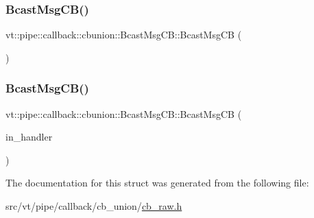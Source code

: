 \subsubsection{\texorpdfstring{Bcast\+Msg\+C\+B()}{BcastMsgCB()}\hspace{0.1cm}{\footnotesize\ttfamily [1/2]}}
{\footnotesize\ttfamily vt\+::pipe\+::callback\+::cbunion\+::\+Bcast\+Msg\+C\+B\+::\+Bcast\+Msg\+CB (\begin{DoxyParamCaption}{ }\end{DoxyParamCaption})\hspace{0.3cm}{\ttfamily [default]}}

\mbox{\label{structvt_1_1pipe_1_1callback_1_1cbunion_1_1_bcast_msg_c_b_a4de829ac98c8ed02f2f4174b31e86345}} 
\subsubsection{\texorpdfstring{Bcast\+Msg\+C\+B()}{BcastMsgCB()}\hspace{0.1cm}{\footnotesize\ttfamily [2/2]}}
{\footnotesize\ttfamily vt\+::pipe\+::callback\+::cbunion\+::\+Bcast\+Msg\+C\+B\+::\+Bcast\+Msg\+CB (\begin{DoxyParamCaption}\item[{\hyperlink{namespacevt_af64846b57dfcaf104da3ef6967917573}{Handler\+Type} const}]{in\+\_\+handler }\end{DoxyParamCaption})\hspace{0.3cm}{\ttfamily [inline]}}



The documentation for this struct was generated from the following file\+:\begin{DoxyCompactItemize}
\item 
src/vt/pipe/callback/cb\+\_\+union/\hyperlink{cb__raw_8h}{cb\+\_\+raw.\+h}\end{DoxyCompactItemize}
